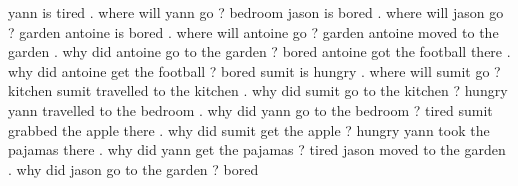 \begin{tcbraster}[raster columns=2,  size=minimal, raster valign=top]
    \begin{tcolorbox}[mybox, title=Task 20:Name, height fill] 
    \tiny
 yann is tired . where will yann go ? bedroom jason is bored . where will jason go ? garden antoine is bored . where will antoine go ? garden antoine moved to the garden . why did antoine go to the garden ? bored antoine got the football there . why did antoine get the football ? bored sumit is hungry . where will sumit go ? kitchen sumit travelled to the kitchen . why did sumit go to the kitchen ? hungry yann travelled to the bedroom . why did yann go to the bedroom ? tired sumit grabbed the apple there . why did sumit get the apple ? hungry yann took the pajamas there . why did yann get the pajamas ? tired jason moved to the garden . why did jason go to the garden ? bored
    \end{tcolorbox}    
\end{tcbraster}
  
